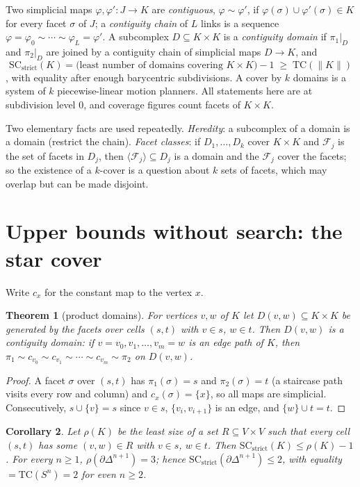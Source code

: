 \documentclass[12pt]{article}
\newcommand{\TC}{\mathrm{TC}}
\newcommand{\SC}{\mathrm{SC}}
\newcommand{\SCst}{\SC_{\mathrm{strict}}}
\newcommand{\gen}[1]{\langle #1\rangle}
\newtheorem{theo}{Theorem}[section]
\newtheorem{corollary}[theo]{Corollary}
\begin{document}
Two simplicial maps $\varphi,\varphi':J\to K$ are \emph{contiguous},
$\varphi\sim\varphi'$, if $\varphi(\sigma)\cup\varphi'(\sigma)\in K$ for
every facet $\sigma$ of $J$; a \emph{contiguity chain} of $L$ links is a
sequence $\varphi=\varphi_0\sim\cdots\sim\varphi_L=\varphi'$.  A subcomplex
$D\subseteq K\times K$ is a \emph{contiguity domain} if $\pi_1|_D$ and
$\pi_2|_D$ are joined by a contiguity chain of simplicial maps $D\to K$, and
\[
\SCst(K)=\bigl(\text{least number of domains covering }K\times K\bigr)-1
\;\ge\;\TC(\|K\|)
\]
\cite{G18,OLGB21}, with equality after enough barycentric subdivisions.  A
cover by $k$ domains is a system of $k$ piecewise-linear motion planners.
All statements here are at subdivision level $0$, and coverage figures count
facets of $K\times K$.

Two elementary facts are used repeatedly.  \emph{Heredity}: a subcomplex of
a domain is a domain (restrict the chain).  \emph{Facet classes}: if
$D_1,\dots,D_k$ cover $K\times K$ and $\mathcal F_j$ is the set of facets in
$D_j$, then $\gen{\mathcal F_j}\subseteq D_j$ is a domain and the
$\mathcal F_j$ cover the facets; so the existence of a $k$-cover is a
question about $k$ sets of facets, which may overlap but can be made
disjoint.

\section{Upper bounds without search: the star cover}\label{sec:star}

Write $c_x$ for the constant map to the vertex $x$.

\begin{theo}[product domains]\label{thm:prod}
For vertices $v,w$ of $K$ let $D(v,w)\subseteq K\times K$ be generated by
the facets over cells $(s,t)$ with $v\in s$, $w\in t$.  Then $D(v,w)$ is a
contiguity domain: if $v=v_0,v_1,\dots,v_m=w$ is an edge path of $K$, then
$\pi_1\sim c_{v_0}\sim c_{v_1}\sim\cdots\sim c_{v_m}\sim\pi_2$ on $D(v,w)$.
\end{theo}

\begin{proof}
A facet $\sigma$ over $(s,t)$ has $\pi_1(\sigma)=s$ and $\pi_2(\sigma)=t$
(a staircase path visits every row and column) and $c_x(\sigma)=\{x\}$, so
all maps are simplicial.  Consecutively, $s\cup\{v\}=s$ since $v\in s$,
$\{v_i,v_{i+1}\}$ is an edge, and $\{w\}\cup t=t$.
\end{proof}

\begin{corollary}\label{cor:rho}
Let $\rho(K)$ be the least size of a set $R\subseteq V\times V$ such that
every cell $(s,t)$ has some $(v,w)\in R$ with $v\in s$, $w\in t$.  Then
$\SCst(K)\le\rho(K)-1$.  For every $n\ge1$, $\rho(\partial\Delta^{n+1})=3$;
hence $\SCst(\partial\Delta^{n+1})\le2$, with equality $=\TC(S^n)=2$ for
even $n\ge2$.
\end{corollary}
\end{document}
